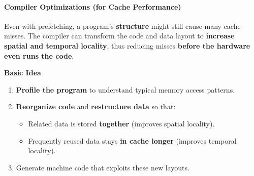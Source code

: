 \paragraph{Compiler Optimizations (for Cache Performance)}

Even with prefetching, a program's \textbf{structure} might still cause many cache misses. The compiler can transform the code and data layout to \textbf{increase spatial and temporal locality}, thus reducing misses \textbf{before the hardware even runs the code}.

\highspace
\begin{flushleft}
    \textcolor{Green3}{ \textbf{Basic Idea}}
\end{flushleft}
\begin{enumerate}
    \item \textbf{Profile the program} to understand typical memory access patterns.
    \item \textbf{Reorganize code} and \textbf{restructure data} so that:
    \begin{itemize}
        \item Related data is stored \textbf{together} (improves spatial locality).
        \item Frequently reused data stays \textbf{in cache longer} (improves temporal locality).
    \end{itemize}
    \item Generate machine code that exploits these new layouts.
\end{enumerate}

